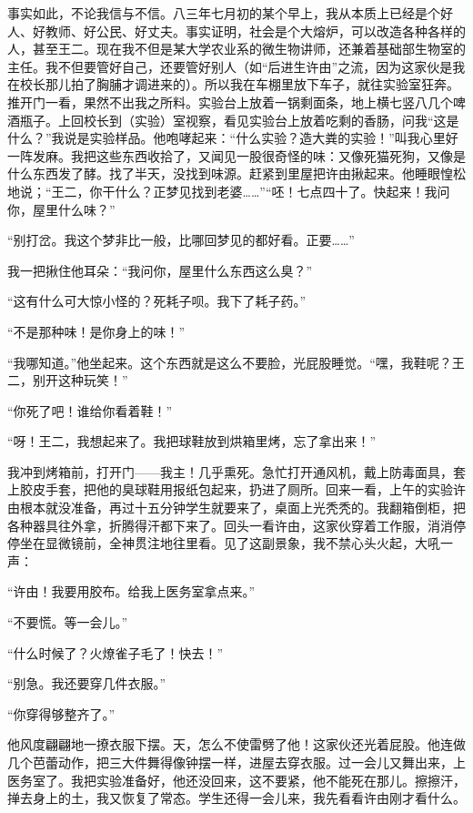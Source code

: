  事实如此，不论我信与不信。八三年七月初的某个早上，我从本质上已经是个好人、好教师、好公民、好丈夫。事实证明，社会是个大熔炉，可以改造各种各样的人，甚至王二。现在我不但是某大学农业系的微生物讲师，还兼着基础部生物室的主任。我不但要管好自己，还要管好别人（如“后进生许由”之流，因为这家伙是我在校长那儿拍了胸脯才调进来的）。所以我在车棚里放下车子，就往实验室狂奔。推开门一看，果然不出我之所料。实验台上放着一锅剩面条，地上横七竖八几个啤酒瓶子。上回校长到（实验）室视察，看见实验台上放着吃剩的香肠，问我“这是什么？”我说是实验样品。他咆哮起来：“什么实验？造大粪的实验！”叫我心里好一阵发麻。我把这些东西收拾了，又闻见一股很奇怪的味：又像死猫死狗，又像是什么东西发了酵。找了半天，没找到味源。赶紧到里屋把许由揪起来。他睡眼惶松地说；“王二，你干什么？正梦见找到老婆……”“呸！七点四十了。快起来！我问你，屋里什么味？” 
 
 “别打岔。我这个梦非比一般，比哪回梦见的都好看。正要……” 
 
 我一把揪住他耳朵：“我问你，屋里什么东西这么臭？” 
 
 “这有什么可大惊小怪的？死耗子呗。我下了耗子药。” 
 
 “不是那种味！是你身上的味！” 
 
 “我哪知道。”他坐起来。这个东西就是这么不要脸，光屁股睡觉。“嘿，我鞋呢？王二，别开这种玩笑！” 
 
 “你死了吧！谁给你看着鞋！” 
 
 “呀！王二，我想起来了。我把球鞋放到烘箱里烤，忘了拿出来！” 
 
 我冲到烤箱前，打开门——我主！几乎熏死。急忙打开通风机，戴上防毒面具，套上胶皮手套，把他的臭球鞋用报纸包起来，扔进了厕所。回来一看，上午的实验许由根本就没准备，再过十五分钟学生就要来了，桌面上光秃秃的。我翻箱倒柜，把各种器具往外拿，折腾得汗都下来了。回头一看许由，这家伙穿着工作服，消消停停坐在显微镜前，全神贯注地往里看。见了这副景象，我不禁心头火起，大吼一声： 
 
 “许由！我要用胶布。给我上医务室拿点来。” 
 
 “不要慌。等一会儿。” 
 
 “什么时候了？火燎雀子毛了！快去！” 
 
 “别急。我还要穿几件衣服。” 
 
 “你穿得够整齐了。” 
 
 他风度翩翩地一撩衣服下摆。天，怎么不使雷劈了他！这家伙还光着屁股。他连做几个芭蕾动作，把三大件舞得像钟摆一样，进屋去穿衣服。过一会儿又舞出来，上医务室了。我把实验准备好，他还没回来，这不要紧，他不能死在那儿。擦擦汗，掸去身上的土，我又恢复了常态。学生还得一会儿来，我先看看许由刚才看什么。 
 
